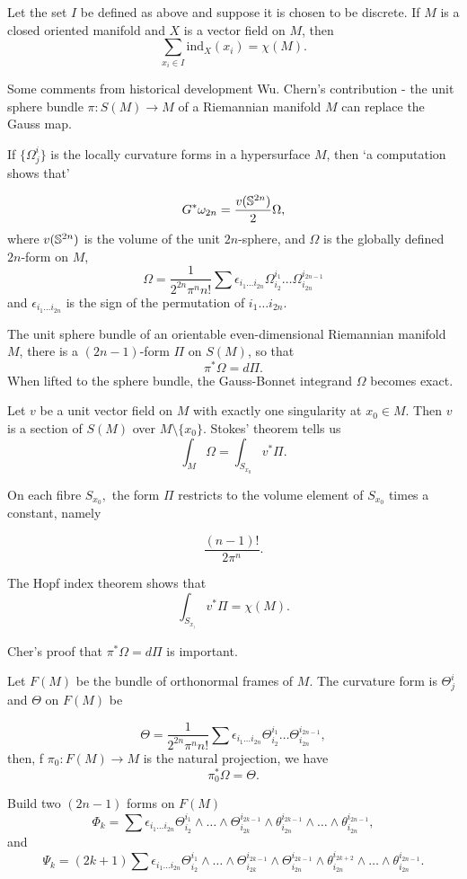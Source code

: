 \begin{theorem}\label{thm:gph}
Let the set $I$ be defined as above and suppose it is chosen to be discrete.
If $M$ is a closed oriented manifold and $X$ is a vector field on $M$, then
$$\sum_{x_i\in I} \text{ind}_X(x_i)=\chi(M).$$
\end{theorem}


Some comments from historical development Wu.
Chern's contribution - the unit sphere bundle $\pi: S(M)\rightarrow M$
of a Riemannian manifold $M$ can replace the Gauss map.

If $\{\Omega_j^i\}$ is the locally curvature forms in a hypersurface $M$,
then `a computation shows that'

$$G^*\omega_{2n}=\frac{v(\mathbb{S}^{2n})}{2}\Omega,$$
where $v(\mathbb{S}^{2n})$ is the volume of the unit $2n$-sphere, and $\Omega$
is the globally defined $2n$-form on $M$,
$$\Omega=\frac{1}{2^{2n}\pi^n n!}\sum \epsilon_{i_1\ldots i_{2n}}\Omega_{i_2}^{i_1}\ldots \Omega_{i_{2n}}^{i_{2n-1}}$$ 
and $\epsilon_{i_1\ldots i_{2n}}$ is the sign of the permutation
of $i_1\ldots i_{2n}$.


The unit sphere bundle of an orientable even-dimensional Riemannian manifold 
$M$, there is a $(2n-1)$-form $\Pi$ on $S(M)$,
so that 
$$\pi^*\Omega = d\Pi.$$
When lifted to the sphere bundle, the Gauss-Bonnet integrand $\Omega$ 
becomes exact.

Let $v$ be a unit vector field on $M$ with exactly one singularity at $x_0\in M.$
Then $v$ is a section of $S(M)$ over $M\setminus \{x_0\}.$
Stokes' theorem tells us
$$\int_M\Omega=\int_{S_{x_0}}v^*\Pi.$$

On each fibre $S_{x_0},$ the form $\Pi$ restricts to the volume element of $S_{x_0}$
times a constant, namely

$$\frac{(n-1)!}{2\pi^n}.$$

The Hopf index theorem shows that
$$\int_{S_{x_)}}v^*\Pi=\chi(M).$$ 

Cher's proof that $\pi^*\Omega=d\Pi$ is important.

Let $F(M)$ be the bundle of orthonormal frames of $M$.
The curvature form is $\Theta_j^i$ and $\Theta$ on $F(M)$
be

$$\Theta=\frac{1}{2^{2n}\pi^n n!}\sum \epsilon_{i_1\ldots i_{2n}}\Theta_{i_2}^{i_1}\ldots \Theta_{i_{2n}}^{i_{2n-1}},$$
then, f $\pi_0:F(M)\rightarrow M$ is the natural projection, we have
$$\pi_0^*\Omega =\Theta.$$

Build two $(2n-1)$ forms on $F(M)$
$$\Phi_k=\sum \epsilon_{i_1\ldots i_{2n}} \Theta_{i_2}^{i_1}\land \ldots\land \Theta_{i_{2k}}^{i_{2k-1}}\land \theta_{i_{2n}}^{i_{2k-1}}\land \ldots \land \theta_{i_{2n}}^{i_{2n-1}},$$
and
$$\Psi_k=(2k+1)\sum \epsilon_{i_1\ldots i_{2n}} \Theta_{i_2}^{i_1}\land \ldots\land \Theta_{i_{2k}}^{i_{2k-1}}\land \Theta_{i_{2n}}^{i_{2k-1}}\land \theta_{i_{2n}}^{i_{2k+2}}\land \ldots \land \theta_{i_{2n}}^{i_{2n-1}}.$$


